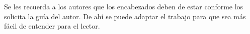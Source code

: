     
    Se les recuerda a los autores que los encabezados deben de estar conforme los solicita la guía del autor. De ahí se puede adaptar el trabajo para que sea más fácil de entender para el lector.
    
    
    
    
    
    
    
